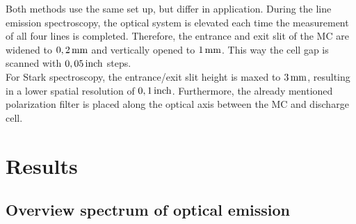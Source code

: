 \documentclass[a4paper,10pt,twoside]{article}
\begin{document}
			Both methods use the same set up, but differ in application. During the line emission spectroscopy, the optical system is elevated each time the measurement of all four lines is completed. Therefore, the entrance and exit slit of the MC are widened to $\unit[0,2]{mm}$ and vertically opened to $\unit[1]{mm}$. This way the cell gap is scanned with $\unit[0,05]{inch}$ steps.\\
			For Stark spectroscopy, the entrance/exit slit height is maxed to $\unit[3]{mm}$, resulting in a lower spatial resolution of $\unit[0,1]{inch}$. Furthermore, the already mentioned polarization filter is placed along the optical axis between the MC and discharge cell.

	\section{Results}

		\subsection{Overview spectrum of optical emission}\label{subsec:overview}
		
\end{document}
